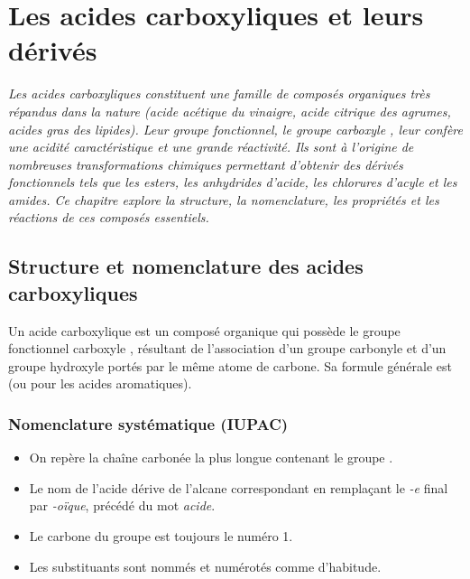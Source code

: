 \chapter{Les acides carboxyliques et leurs dérivés}

\textit{Les acides carboxyliques constituent une famille de composés organiques très répandus dans la nature (acide acétique du vinaigre, acide citrique des agrumes, acides gras des lipides). Leur groupe fonctionnel, le groupe carboxyle , leur confère une acidité caractéristique et une grande réactivité. Ils sont à l'origine de nombreuses transformations chimiques permettant d'obtenir des dérivés fonctionnels tels que les esters, les anhydrides d'acide, les chlorures d'acyle et les amides. Ce chapitre explore la structure, la nomenclature, les propriétés et les réactions de ces composés essentiels.}

\section{Structure et nomenclature des acides carboxyliques}

\begin{definition}
Un acide carboxylique est un composé organique qui possède le groupe fonctionnel carboxyle , résultant de l'association d'un groupe carbonyle  et d'un groupe hydroxyle  portés par le même atome de carbone. Sa formule générale est  (ou  pour les acides aromatiques).
\end{definition}

\begin{illustration}
\begin{center}
\end{center}
\end{illustration}

\subsection{Nomenclature systématique (IUPAC)}

\begin{propriete}
\begin{itemize}
    \item On repère la chaîne carbonée la plus longue contenant le groupe .
    \item Le nom de l'acide dérive de l'alcane correspondant en remplaçant le \textit{-e} final par \textit{-oïque}, précédé du mot \textit{acide}.
    \item Le carbone du groupe  est toujours le numéro 1.
    \item Les substituants sont nommés et numérotés comme d'habitude.
\end{itemize}
\end{propriete}

